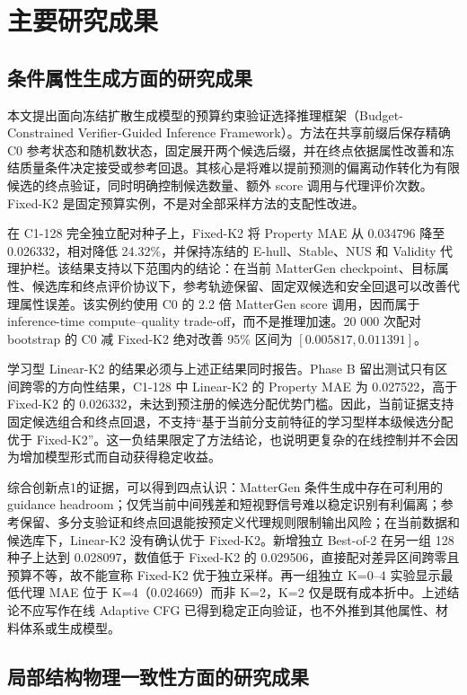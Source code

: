 \section{主要研究成果}

\subsection{条件属性生成方面的研究成果}

本文提出面向冻结扩散生成模型的预算约束验证选择推理框架（Budget-Constrained Verifier-Guided Inference Framework）。方法在共享前缀后保存精确 C0 参考状态和随机数状态，固定展开两个候选后缀，并在终点依据属性改善和冻结质量条件决定接受或参考回退。其核心是将难以提前预测的偏离动作转化为有限候选的终点验证，同时明确控制候选数量、额外 score 调用与代理评价次数。Fixed-K2 是固定预算实例，不是对全部采样方法的支配性改进。

在 C1-128 完全独立配对种子上，Fixed-K2 将 Property MAE 从 0.034796 降至 0.026332，相对降低 24.32\%，并保持冻结的 E-hull、Stable、NUS 和 Validity 代理护栏。该结果支持以下范围内的结论：在当前 MatterGen checkpoint、目标属性、候选库和终点评价协议下，参考轨迹保留、固定双候选和安全回退可以改善代理属性误差。该实例约使用 C0 的 2.2 倍 MatterGen score 调用，因而属于 inference-time compute--quality trade-off，而不是推理加速。20 000 次配对 bootstrap 的 C0 减 Fixed-K2 绝对改善 95\% 区间为 $[0.005817,0.011391]$。

学习型 Linear-K2 的结果必须与上述正结果同时报告。Phase B 留出测试只有区间跨零的方向性结果，C1-128 中 Linear-K2 的 Property MAE 为 0.027522，高于 Fixed-K2 的 0.026332，未达到预注册的候选分配优势门槛。因此，当前证据支持固定候选组合和终点回退，不支持``基于当前分支前特征的学习型样本级候选分配优于 Fixed-K2''。这一负结果限定了方法结论，也说明更复杂的在线控制并不会因为增加模型形式而自动获得稳定收益。

综合创新点1的证据，可以得到四点认识：MatterGen 条件生成中存在可利用的 guidance headroom；仅凭当前中间残差和短视野信号难以稳定识别有利偏离；参考保留、多分支验证和终点回退能按预定义代理规则限制输出风险；在当前数据和候选库下，Linear-K2 没有确认优于 Fixed-K2。新增独立 Best-of-2 在另一组 128 种子上达到 0.028097，数值低于 Fixed-K2 的 0.029506，直接配对差异区间跨零且预算不等，故不能宣称 Fixed-K2 优于独立采样。再一组独立 K=0--4 实验显示最低代理 MAE 位于 K=4（0.024669）而非 K=2，K=2 仅是既有成本折中。上述结论不应写作在线 Adaptive CFG 已得到稳定正向验证，也不外推到其他属性、材料体系或生成模型。

\subsection{局部结构物理一致性方面的研究成果}

